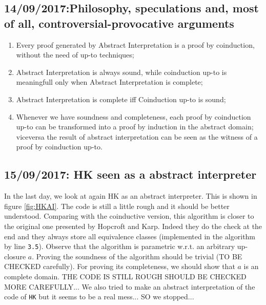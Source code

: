 \documentclass{llncs}
\begin{document}
\subsection{14/09/2017:Philosophy, speculations and, most of all, controversial-provocative arguments}
\begin{enumerate}
\item Every proof generated by Abstract Interpretation is a proof by coinduction, without the need of up-to techniques;
\item Abstract Interpretation is always sound, while coinduction up-to is meaningfull only when Abstract Interpretation is complete;
\item Abstract Interpretation is complete iff Coinduction up-to is sound;
\item Whenever we have soundness and completeness, each proof by coinduction up-to can be transformed into a proof by induction in the abstract domain; viceversa the result of abstract interpretation can be seen as the witness of a proof by coinduction up-to.   
\end{enumerate}
%



\subsection{15/09/2017: HK seen as a abstract interpreter}
In the last day, we look at again HK as an abstract interpreter. This is shown in figure \ref{fig:HKAI}. The code is still a little rough and it should be better understood. Comparing with the coinductive version, this algorithm is closer to the original one presented by Hopcroft and Karp. Indeed they do the check at the end and they always store all equivalence classes (implemented in the algorithm by line \texttt{3.5}). 
Observe that the algorithm is parametric w.r.t. an arbitrary up-closure $a$. Proving the soundness of the algorithm should be trivial (TO BE CHECKED carefully). For proving its completeness, we should show that $a$ is an complete domain. THE CODE IS STILL ROUGH SHOULD BE CHECKED MORE CAREFULLY... We also tried to make an abstract interpretation of the code of \texttt{HK} but it seems to be a real mess... SO we stopped...
\end{document}
